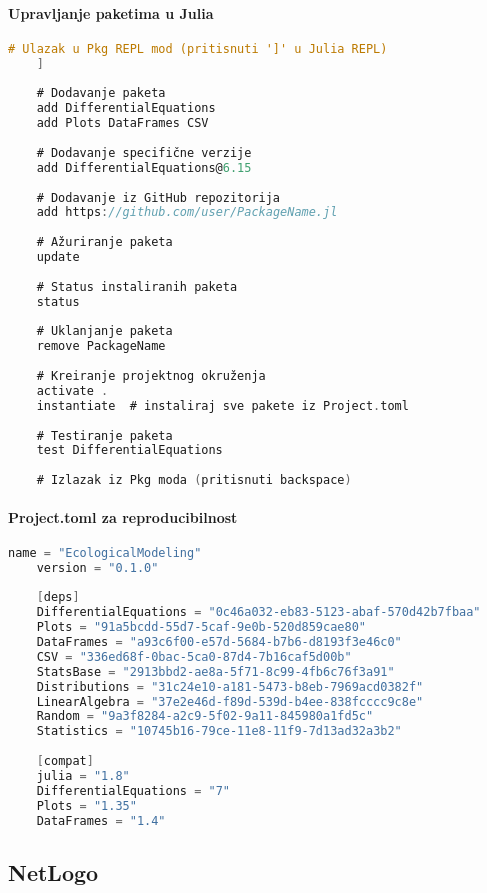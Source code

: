 \documentclass[11pt,oneside]{book}
\begin{document}
\paragraph{Upravljanje paketima u Julia}

\begin{lstlisting}[language=C, caption=Julia package management]
	# Ulazak u Pkg REPL mod (pritisnuti ']' u Julia REPL)
	] 
	
	# Dodavanje paketa
	add DifferentialEquations
	add Plots DataFrames CSV
	
	# Dodavanje specifične verzije
	add DifferentialEquations@6.15
	
	# Dodavanje iz GitHub repozitorija
	add https://github.com/user/PackageName.jl
	
	# Ažuriranje paketa
	update
	
	# Status instaliranih paketa
	status
	
	# Uklanjanje paketa
	remove PackageName
	
	# Kreiranje projektnog okruženja
	activate .
	instantiate  # instaliraj sve pakete iz Project.toml
	
	# Testiranje paketa
	test DifferentialEquations
	
	# Izlazak iz Pkg moda (pritisnuti backspace)
\end{lstlisting}

\paragraph{Project.toml za reproducibilnost}

\begin{lstlisting}[language=C, caption=Project.toml za ekološki projekt]
	name = "EcologicalModeling"
	version = "0.1.0"
	
	[deps]
	DifferentialEquations = "0c46a032-eb83-5123-abaf-570d42b7fbaa"
	Plots = "91a5bcdd-55d7-5caf-9e0b-520d859cae80"
	DataFrames = "a93c6f00-e57d-5684-b7b6-d8193f3e46c0"
	CSV = "336ed68f-0bac-5ca0-87d4-7b16caf5d00b"
	StatsBase = "2913bbd2-ae8a-5f71-8c99-4fb6c76f3a91"
	Distributions = "31c24e10-a181-5473-b8eb-7969acd0382f"
	LinearAlgebra = "37e2e46d-f89d-539d-b4ee-838fcccc9c8e"
	Random = "9a3f8284-a2c9-5f02-9a11-845980a1fd5c"
	Statistics = "10745b16-79ce-11e8-11f9-7d13ad32a3b2"
	
	[compat]
	julia = "1.8"
	DifferentialEquations = "7"
	Plots = "1.35"
	DataFrames = "1.4"
\end{lstlisting}

\subsection{NetLogo}
\end{document}

